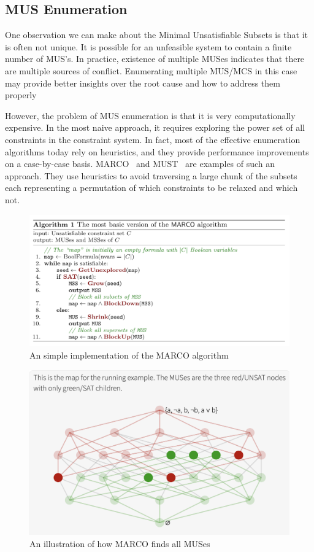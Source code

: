 \subsection{MUS Enumeration}
One observation we can make about the  Minimal Unsatisfiable Subsets is that it is often not unique. It is possible for an unfeasible system to contain a finite number of MUS’s. In practice, existence of multiple MUSes indicates that there are multiple sources of conflict. Enumerating multiple MUS/MCS in this case may provide better insights over the root cause and how to address them properly


However, the problem of MUS enumeration is that it is very computationally expensive. In the most naive approach, it requires exploring the power set of all constraints in the constraint system. In fact, most of the effective enumeration algorithms today rely on heuristics, and they provide performance improvements on a case-by-case basis. MARCO~\cite{Liffiton2016-xi} and MUST~\cite{Bendik2020-pz} are examples of such an approach. They use heuristics to avoid traversing a large chunk of the subsets each representing a permutation of which constraints to be relaxed and which not.


\begin{figure}[hbt]
  \includegraphics[width=\linewidth]{MarcoAlgo}
  \caption{An simple implementation of the MARCO algorithm}
\end{figure}


\begin{figure}[hbt]
  \includegraphics[width=\linewidth]{MarcoViz}
  \caption{An illustration of how MARCO finds all MUSes}
\end{figure}
  

